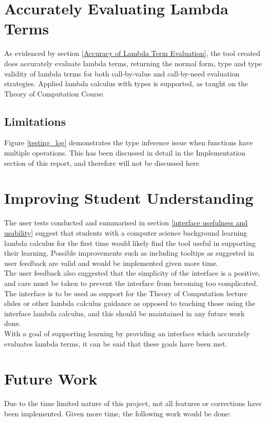 \documentclass[a4paper,11pt]{report}
\begin{document}
\section{Accurately Evaluating Lambda Terms}
As evidenced by section \ref{Accuracy of Lambda Term Evaluation}, the tool created does accurately evaluate lambda terms, returning the normal form, type and type validity of lambda terms for both call-by-value and call-by-need evaluation strategies. Applied lambda calculus with types is supported, as taught on the Theory of Computation Course.

\subsection{Limitations}
Figure \ref{testing_log} demonstrates the type inference issue when functions have multiple operations. This has been discussed in detail in the Implementation section of this report, and therefore will not be discussed here.

\section{Improving Student Understanding}
The user tests conducted and summarised in section \ref{interface usefulness and usability} suggest that students with a computer science background learning lambda calculus for the first time would likely find the tool useful in supporting their learning. Possible improvements such as including tooltips as suggested in user feedback are valid and would be implemented given more time.\\

The user feedback also suggested that the simplicity of the interface is a positive, and care must be taken to prevent the interface from becoming too complicated. The interface is to be used as support for the Theory of Computation lecture slides or other lambda calculus guidance as opposed to teaching those using the interface lambda calculus, and this should be maintained in any future work done.\\

With a goal of supporting learning by providing an interface which accurately evaluates lambda terms, it can be said that these goals have been met.

\section{Future Work}
Due to the time limited nature of this project, not all features or corrections have been implemented. Given more time, the following work would be done:
\end{document}
